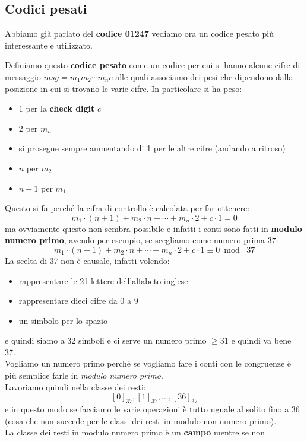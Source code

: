 \documentclass[a4paper,12pt, oneside]{book}
\begin{document}
\subsection{Codici pesati}
Abbiamo già parlato del \textbf{codice 01247} vediamo ora un codice pesato più
interessante e utilizzato.
\begin{definizione}
  Definiamo questo \textbf{codice pesato} come un codice per cui si hanno alcune cifre
  di messaggio $msg=m_1m_2\cdots m_nc$ alle quali associamo dei pesi che
  dipendono dalla posizione in cui si trovano le varie cifre. In particolare si
  ha peso:
  \begin{itemize}
    \item $1$ per la \textbf{check digit} $c$
    \item $2$ per $m_n$
    \item si prosegue sempre aumentando di 1 per le altre cifre (andando a
    ritroso) 
    \item $n$ per $m_2$
    \item $n+1$ per $m_1$
  \end{itemize}
\end{definizione}
Questo si fa perché la cifra di controllo è calcolata per far ottenere:
\[m_1\cdot (n+1)+m_2\cdot n+\cdots+m_n\cdot 2+c\cdot 1=0\]
ma ovviamente questo non sembra possibile e infatti i conti sono fatti in
\textbf{modulo numero primo}, avendo per esempio, se scegliamo come numero
prima $37$:
\[m_1\cdot (n+1)+m_2\cdot n+\cdots+m_n\cdot 2+c\cdot 1\equiv 0\bmod\,\, 37\]
La scelta di 37 non è causale, infatti volendo:
\begin{itemize}
  \item rappresentare le 21 lettere dell'alfabeto inglese
  \item rappresentare dieci cifre da 0 a 9
  \item un simbolo per lo spazio
\end{itemize}
e quindi siamo a 32 simboli e ci serve un numero primo $\geq 31$ e quindi va
bene 37.\\
Vogliamo un numero primo perché se vogliamo fare i conti con le congruenze è
più semplice farle in \emph{modulo numero primo}.\\
Lavoriamo quindi nella classe dei resti:
\[[0]_{37},[1]_{37},\ldots, [36]_{37}\]
e in questo modo se facciamo le varie operazioni è tutto uguale al solito fino
a 36 (cosa che non succede per le classi dei resti in modulo non numero
primo).\\
La classe dei resti in modulo numero primo è un \textbf{campo} mentre se non
\end{document}
